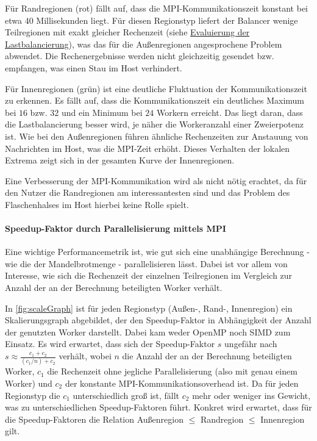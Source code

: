 Für Randregionen (rot) fällt auf, dass die MPI-Kommunikationszeit konstant bei etwa \( 40 \) Millisekunden liegt.
Für diesen Regionstyp liefert der Balancer wenige Teilregionen mit exakt gleicher Rechenzeit (siehe \hyperref[sec:lastbalancierung_eval]{Evaluierung der Lastbalancierung}), 
was das für die Außenregionen angesprochene Problem abwendet. 
Die Rechenergebnisse werden nicht gleichzeitig gesendet bzw. empfangen, was einen Stau im Host verhindert.

Für Innenregionen (grün) ist eine deutliche Fluktuation der Kommunikationszeit zu erkennen.
Es fällt auf, dass die Kommunikationszeit ein deutliches Maximum bei \( 16 \) bzw. \( 32 \) und ein Minimum bei \( 24 \) Workern erreicht.
Das liegt daran, dass die Lastbalancierung besser wird, je näher die Workeranzahl einer Zweierpotenz ist.
Wie bei den Außenregionen führen ähnliche Rechenzeiten zur Anstauung von Nachrichten im Host, was die MPI-Zeit erhöht.
Dieses Verhalten der lokalen Extrema zeigt sich in der gesamten Kurve der Innenregionen.

Eine Verbesserung der MPI-Kommunikation wird als nicht nötig erachtet, da für den Nutzer die Randregionen am interessantesten sind und das Problem des Flaschenhalses im Host hierbei keine Rolle spielt.

\paragraph{Speedup-Faktor durch Parallelisierung mittels MPI}

Eine wichtige Performancemetrik ist, wie gut sich eine unabhängige Berechnung - wie die der Mandelbrotmenge - parallelisieren lässt. Dabei ist vor allem von Interesse, wie sich die Rechenzeit der einzelnen Teilregionen im Vergleich zur Anzahl der an der Berechnung beteiligten Worker verhält.

In \autoref{fig:scaleGraph} ist für jeden Regionstyp (Außen-, Rand-, Innenregion) ein Skalierungsgraph abgebildet, 
der den Speedup-Faktor in Abhängigkeit der Anzahl der genutzten Worker darstellt. 
Dabei kam weder OpenMP noch SIMD zum Einsatz. Es wird erwartet, dass sich der Speedup-Faktor \( s \) ungefähr nach \( s \approx \frac{c_1 + c_2}{(c_1/n) + c_2} \) verhält, 
wobei \( n \) die Anzahl der an der Berechnung beteiligten Worker, 
\( c_1 \) die Rechenzeit ohne jegliche Parallelisierung (also mit genau einem Worker) und \( c_2 \) der konstante MPI-Kommunikationsoverhead ist. 
Da für jeden Regionstyp die \( c_1 \) unterschiedlich groß ist, fällt \( c_2 \) mehr oder weniger ins Gewicht, 
was zu unterschiedlichen Speedup-Faktoren führt. 
Konkret wird erwartet, dass für die Speedup-Faktoren die Relation Außenregion \( \leqslant \) Randregion \( \leqslant \) Innenregion gilt.

